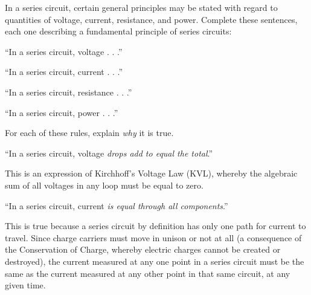 

In a series circuit, certain general principles may be stated with regard to quantities of voltage, current, resistance, and power.  Complete these sentences, each one describing a fundamental principle of series circuits:

\vskip 10pt

\noindent
``In a series circuit, voltage . . .''

\vskip 10pt

\noindent
``In a series circuit, current . . .''

\vskip 10pt

\noindent
``In a series circuit, resistance . . .''

\vskip 10pt

\noindent
``In a series circuit, power . . .''

\vskip 10pt

For each of these rules, explain {\it why} it is true.







\noindent
``In a series circuit, voltage {\it drops add to equal the total}.''

\vskip 10pt

This is an expression of Kirchhoff's Voltage Law (KVL), whereby the algebraic sum of all voltages in any loop must be equal to zero.




\vskip 30pt

\noindent
``In a series circuit, current {\it is equal through all components}.''

\vskip 10pt

This is true because a series circuit by definition has only one path for current to travel.  Since charge carriers must move in unison or not at all (a consequence of the Conservation of Charge, whereby electric charges cannot be created or destroyed), the current measured at any one point in a series circuit must be the same as the current measured at any other point in that same circuit, at any given time.



\vskip 30pt

